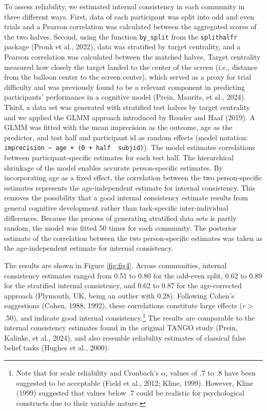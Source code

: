 \documentclass[
  man,floatsintext]{apa7}
\begin{document}
To assess reliability, we estimated internal consistency in each community in three different ways.
First, data of each participant was split into odd and even trials and a Pearson correlation was calculated between the aggregated scores of the two halves.
Second, using the function \texttt{by\_split} from the \texttt{splithalfr} package (Pronk et al., 2022), data was stratified by target centrality, and a Pearson correlation was calculated between the matched halves.
Target centrality measured how closely the target landed to the center of the screen (i.e., distance from the balloon center to the screen center), which served as a proxy for trial difficulty and was previously found to be a relevant component in predicting participants' performance in a cognitive model (Prein, Maurits, et al., 2024).
Third, a data set was generated with stratified test halves by target centrality and we applied the GLMM approach introduced by Rouder and Haaf (2019).
A GLMM was fitted with the mean imprecision as the outcome, age as the predictor, and test half and participant id as random effects (model notation: \texttt{imprecision\ \textasciitilde{}\ age\ +\ (0\ +\ half\ \textbar{}\ subjid)}).
The model estimates correlations between participant-specific estimates for each test half.
The hierarchical shrinkage of the model enables accurate person-specific estimates.
By incorporating age as a fixed effect, the correlation between the two person-specific estimates represents the age-independent estimate for internal consistency.
This removes the possibility that a good internal consistency estimate results from general cognitive development rather than task-specific inter-individual differences.
Because the process of generating stratified data sets is partly random, the model was fitted 50 times for each community.
The posterior estimate of the correlation between the two person-specific estimates was taken as the age-independent estimate for internal consistency.

The results are shown in Figure \ref{fig:fig4}.
Across communities, internal consistency estimates ranged from 0.51 to 0.80 for the odd-even split, 0.62 to 0.89 for the stratified internal consistency, and 0.62 to 0.87 for the age-corrected approach (Plymouth, UK, being an outlier with 0.28).
Following Cohen's suggestions (Cohen, 1988, 1992), these correlations constitute large effects (\emph{r} \textgreater{} .50), and indicate good internal consistency.\footnote{Note that for scale reliability and Cronbach's \(\alpha\), values of .7 to .8 have been suggested to be acceptable (Field et al., 2012; Kline, 1999). However, Kline (1999) suggested that values below .7 could be realistic for psychological constructs due to their variable nature.}
The results are comparable to the internal consistency estimates found in the original TANGO study (Prein, Kalinke, et al., 2024), and also resemble reliability estimates of classical false belief tasks (Hughes et al., 2000).
\end{document}
